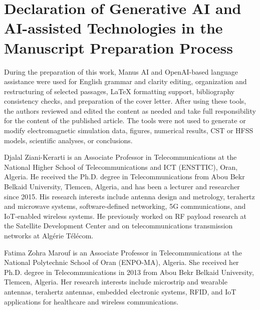 \documentclass[a4paper,fleqn]{cas-dc}
\begin{document}
\section*{Declaration of Generative AI and AI-assisted Technologies in the Manuscript Preparation Process}
During the preparation of this work, Manus AI and OpenAI-based language assistance were used for English grammar and clarity editing, organization and restructuring of selected passages, LaTeX formatting support, bibliography consistency checks, and preparation of the cover letter. After using these tools, the authors reviewed and edited the content as needed and take full responsibility for the content of the published article. The tools were not used to generate or modify electromagnetic simulation data, figures, numerical results, CST or HFSS models, scientific analyses, or conclusions.

\printcredits



Djalal Ziani-Kerarti is an Associate Professor in Telecommunications at the National Higher School of Telecommunications and ICT (ENSTTIC), Oran, Algeria. He received the Ph.D. degree in Telecommunications from Abou Bekr Belkaid University, Tlemcen, Algeria, and has been a lecturer and researcher since 2015. His research interests include antenna design and metrology, terahertz and microwave systems, software-defined networking, 5G communications, and IoT-enabled wireless systems. He previously worked on RF payload research at the Satellite Development Center and on telecommunications transmission networks at Algérie Télécom.
\endbio

Fatima Zohra Marouf is an Associate Professor in Telecommunications at the National Polytechnic School of Oran (ENPO-MA), Algeria. She received her Ph.D. degree in Telecommunications in 2013 from Abou Bekr Belkaid University, Tlemcen, Algeria. Her research interests include microstrip and wearable antennas, terahertz antennas, embedded electronic systems, RFID, and IoT applications for healthcare and wireless communications.
\endbio
\end{document}
